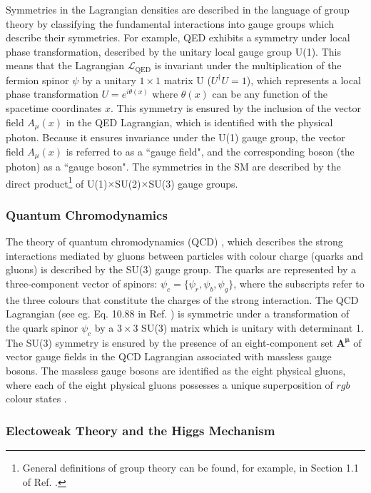 Symmetries in the Lagrangian densities are described in the language of group theory by classifying the fundamental interactions into gauge groups which describe their symmetries. For example, QED exhibits a symmetry under local phase transformation, described by the unitary local gauge group U(1). This means that the Lagrangian \(\mathcal{L}_\text{QED}\) is invariant under the multiplication of the fermion spinor \(\psi\) by a unitary \(1\times1\) matrix U (\(U^\dagger U=1\)), which represents a local phase transformation \(U = e^{i\theta(x)}\) where \(\theta(x)\) can be any function of the spacetime coordinates \(x\). This symmetry is ensured by the inclusion of the vector field \(A_\mu(x)\) in the QED Lagrangian, which is identified with the physical photon. Because it ensures invariance under the U(1) gauge group, the vector field \(A_\mu(x)\) is referred to as a ``gauge field", and the corresponding boson (the photon) as a ``gauge boson". The symmetries in the SM are described by the direct product\footnote{General definitions of group theory can be found, for example, in Section 1.1 of Ref. \cite{costa2012symmetries}.} of U(1)\(\times\)SU(2)\(\times\)SU(3) gauge groups. 

\subsubsection{Quantum Chromodynamics}

The theory of quantum chromodynamics (QCD) \cite{qcd_2007}, which describes the strong interactions mediated by gluons between particles with colour charge (quarks and gluons) is described by the SU(3) gauge group. The quarks are represented by a three-component vector of spinors: \(\psi_c = \{\psi_r, \psi_b, \psi_g\}\), where the subscripts refer to the three colours that constitute the charges of the strong interaction. The QCD Lagrangian (see eg. Eq. 10.88 in Ref. \cite{griffiths_2008}) is symmetric under a transformation of the quark spinor \(\psi_c\) by a \(3\times3\) SU(3) matrix which is unitary with determinant 1. The SU(3) symmetry is ensured by the presence of an eight-component set \(\boldsymbol{\boldsymbol{A}^\mu}\) of vector gauge fields in the QCD Lagrangian associated with massless gauge bosons. The massless gauge bosons are identified as the eight physical gluons, where each of the eight physical gluons possesses a unique superposition of \({rgb}\) colour states \cite{griffiths_2008}.

\subsubsection{Electoweak Theory and the Higgs Mechanism}

